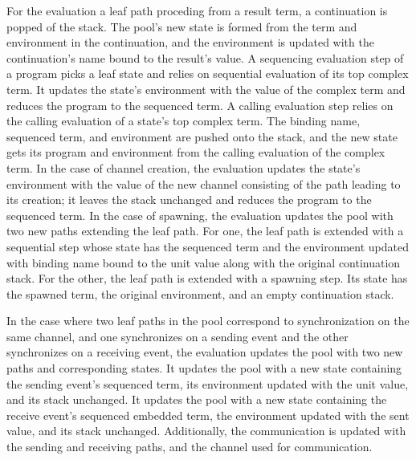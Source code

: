 \documentclass[letterpaper, 11pt]{report}
\begin{document}
For the evaluation a leaf path proceding from a result term, a continuation is popped of the
stack. The pool's new state is formed from the term and environment in the continuation, and
the environment is updated with the continuation's name bound to the result's value.
A sequencing evaluation step of a program picks a leaf state and relies on
sequential evaluation of its top complex term. It updates the state's environment with the
value of the complex term and reduces the program to the sequenced term.
A calling evaluation step relies on the calling evaluation of a state's top
complex term. The binding name, sequenced term, and environment are pushed onto the stack,
and the new state gets its program and environment from the calling evaluation of the complex term. 
In the case of channel creation, the evaluation updates the state's environment with the
value of the new channel consisting of the path leading to its creation; it leaves the stack
unchanged and reduces the program to the sequenced term.
In the case of spawning, the evaluation updates the pool with two
new paths extending the leaf path. For one, the leaf path is extended with a sequential
step whose state has the sequenced term and the environment updated
with binding name bound to the unit value along with the original continuation stack.
For the other, the leaf path is
extended with a spawning step.
Its state has the spawned term, the original environment, and an empty continuation stack. 

In the case where two leaf paths in the pool correspond to synchronization on the same channel,
and one synchronizes on a sending event and the other synchronizes on a receiving event, the
evaluation updates the pool with two new paths and corresponding states.
It updates the pool with a new state containing the sending event's sequenced term, its environment updated with the unit value, and its stack unchanged.
It updates the pool with a new state containing the receive event's sequenced embedded term,
the environment updated with the sent value, and its stack unchanged.
Additionally, the communication is updated with the sending and receiving paths,
and the channel used for communication. 
\end{document}
